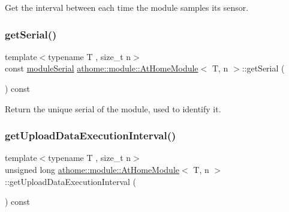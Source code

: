 Get the interval between each time the module samples its sensor. \mbox{\label{classathome_1_1module_1_1_at_home_module_a1267bc33e38b25ba52bceddc60ea7df1}} 
\subsubsection{\texorpdfstring{get\+Serial()}{getSerial()}}
{\footnotesize\ttfamily template$<$typename T , size\+\_\+t n$>$ \\
const \mbox{\hyperlink{classathome_1_1module_1_1_at_home_module_aaa31c8eddb689010ef59deba4e1463c6}{module\+Serial}} \mbox{\hyperlink{classathome_1_1module_1_1_at_home_module}{athome\+::module\+::\+At\+Home\+Module}}$<$ T, n $>$\+::get\+Serial (\begin{DoxyParamCaption}{ }\end{DoxyParamCaption}) const\hspace{0.3cm}{\ttfamily [inline]}}

Return the unique serial of the module, used to identify it. \mbox{\label{classathome_1_1module_1_1_at_home_module_a6186e04da0e46cf463d24947538380bb}} 
\subsubsection{\texorpdfstring{get\+Upload\+Data\+Execution\+Interval()}{getUploadDataExecutionInterval()}}
{\footnotesize\ttfamily template$<$typename T , size\+\_\+t n$>$ \\
unsigned long \mbox{\hyperlink{classathome_1_1module_1_1_at_home_module}{athome\+::module\+::\+At\+Home\+Module}}$<$ T, n $>$\+::get\+Upload\+Data\+Execution\+Interval (\begin{DoxyParamCaption}{ }\end{DoxyParamCaption}) const\hspace{0.3cm}{\ttfamily [inline]}}

